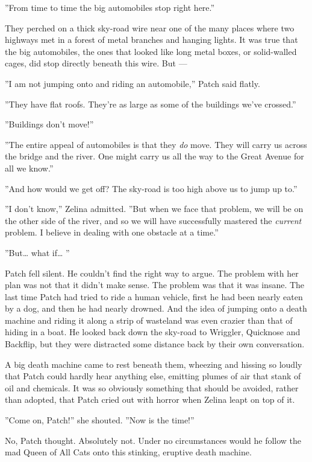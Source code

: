 \documentclass[12pt]{book}
\begin{document}
''From time to time the big automobiles stop right here.''

They perched on a thick sky-road wire near one of the many places where two highways met in a forest of metal branches and hanging lights. It was true that the big automobiles, the ones that looked like long metal boxes, or solid-walled cages, did stop directly beneath this wire. But ---

''I am not jumping onto and riding an automobile,'' Patch said flatly.

''They have flat roofs. They're as large as some of the buildings we've crossed.''

''Buildings don't move!''

''The entire appeal of automobiles is that they {\it do} move. They will carry us across the bridge and the river. One might carry us all the way to the Great Avenue for all we know.''

''And how would we get off? The sky-road is too high above us to jump up to.''

''I don't know,'' Zelina admitted. ''But when we face that problem, we will be on the other side of the river, and so we will have successfully mastered the {\it current} problem. I believe in dealing with one obstacle at a time.''

''But\ldots{}
what if\ldots{}
''

Patch fell silent. He couldn't find the right way to argue. The problem with her plan was not that it didn't make sense. The problem was that it was insane. The last time Patch had tried to ride a human vehicle, first he had been nearly eaten by a dog, and then he had nearly drowned. And the idea of jumping onto a death machine and riding it along a strip of wasteland was even crazier than that of hiding in a boat. He looked back down the sky-road to Wriggler, Quicknose and Backflip, but they were distracted some distance back by their own conversation.

A big death machine came to rest beneath them, wheezing and hissing so loudly that Patch could hardly hear anything else, emitting plumes of air that stank of oil and chemicals. It was so obviously something that should be avoided, rather than adopted, that Patch cried out with horror when Zelina leapt on top of it.

''Come on, Patch!'' she shouted. ''Now is the time!''

No, Patch thought. Absolutely not. Under no circumstances would he follow the mad Queen of All Cats onto this stinking, eruptive death machine.
\end{document}
